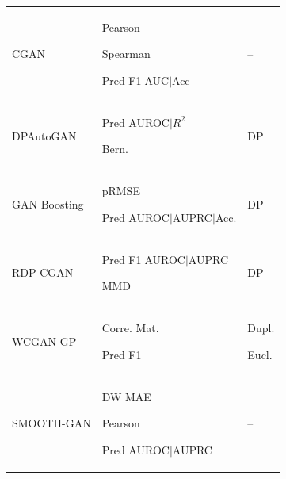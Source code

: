 \begin{landscape}
\begin{table}[htbp]
\begin{tabular}{p{26mm} p{84mm} p{60mm}}
CGAN &	\begin{enumerate*} \item Pearson
\item Spearman \item Pred F1$\vert$AUC$\vert$Acc \end{enumerate*}  &	-- \\

DPAutoGAN & \begin{enumerate*} \item Pred AUROC$\vert$$R^2$  \item Bern. \end{enumerate*}	
 &	DP \\
GAN Boosting & \begin{enumerate*} \item pRMSE \item Pred AUROC$\vert$AUPRC$\vert$Acc. \end{enumerate*}	
	& DP \\
RDP-CGAN & \begin{enumerate*} \item Pred F1$\vert$AUROC$\vert$AUPRC \item MMD  \end{enumerate*}	
	& DP \\
WCGAN-GP & \begin{enumerate*} \item Corre. Mat.
 \item Pred F1  \end{enumerate*} & \begin{enumerate*} \item Dupl.
\item Eucl. \end{enumerate*} \\
SMOOTH-GAN & \begin{enumerate*} \item DW MAE \item Pearson  \item Pred AUROC$\vert$AUPRC \end{enumerate*}	
	& -- \\
\hline

\end{tabular}
\end{table}
\end{landscape}




